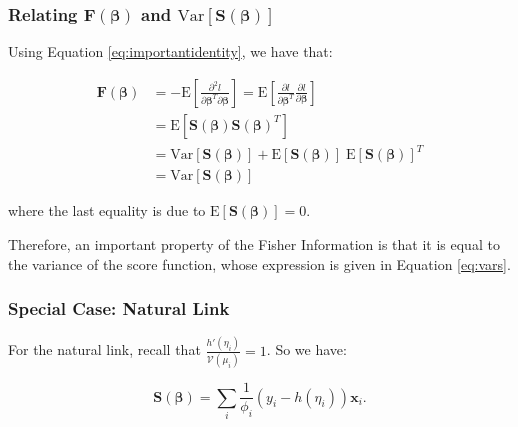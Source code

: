 \documentclass[
  12pt,
]{book}
\begin{document}
\subsubsection{\texorpdfstring{Relating \(\boldsymbol{F}(\boldsymbol{\beta})\) and \({\mathrm{Var}}[\boldsymbol{S}(\boldsymbol{\beta})]\)}{Relating \textbackslash boldsymbol\{F\}(\textbackslash boldsymbol\{\textbackslash beta\}) and \{\textbackslash mathrm\{Var\}\}{[}\textbackslash boldsymbol\{S\}(\textbackslash boldsymbol\{\textbackslash beta\}){]}}}\label{relating-boldsymbolfboldsymbolbeta-and-mathrmvarboldsymbolsboldsymbolbeta}

Using Equation \eqref{eq:importantidentity}, we have that:

\begin{align}
  \boldsymbol{F}(\boldsymbol{\beta})
  & = - \mathrm{E} \left[ \frac{\partial^{2} l}{\partial \boldsymbol{\beta}^{T}\partial\boldsymbol{\beta}} \right]
    = \mathrm{E} \left[ \frac{\partial l}{\partial \boldsymbol{\beta}^{T}} \frac{\partial l}{\partial\boldsymbol{\beta}} \right] \\
  & = {\mathrm E}[\boldsymbol{S}(\boldsymbol{\beta})\boldsymbol{S}(\boldsymbol{\beta})^{T}] \\
  & = {\mathrm{Var}}[\boldsymbol{S}(\boldsymbol{\beta})] + {\mathrm E}[\boldsymbol{S}(\boldsymbol{\beta})] \;{\mathrm E}[\boldsymbol{S}(\boldsymbol{\beta})]^{T} \\
  & = {\mathrm{Var}}[\boldsymbol{S}(\boldsymbol{\beta})]
\end{align}

where the last equality is due to \({\mathrm E}[\boldsymbol{S}(\boldsymbol{\beta})] = 0\).

Therefore, an important property of the Fisher Information is that it is equal to the variance of the score function, whose expression is given in Equation \eqref{eq:vars}.

\subsubsection{Special Case: Natural Link}\label{special-case-natural-link-1}

For the natural link, recall that \(\displaystyle \frac{h'(\eta_i)}{\mathcal{V}(\mu_i)} = 1\). So we have:

\begin{equation}
  \boldsymbol{S}(\boldsymbol{\beta}) = \sum_i \frac{1}{\phi_i} (y_i - h(\eta_i))\boldsymbol{x}_i.
\end{equation}
\end{document}

